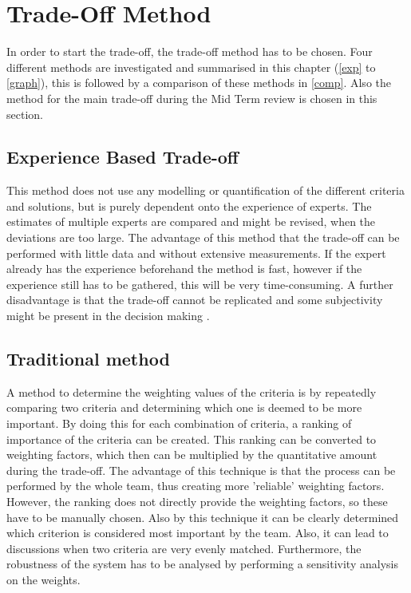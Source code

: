 \newpage
\chapter{Trade-Off Method}
\label{ch4-method}


In order to start the trade-off, the trade-off method has to be chosen. Four different methods are investigated and summarised in this chapter (\autoref{exp} to \autoref{graph}), this is followed by a comparison of these methods in \autoref{comp}. Also the method for the main trade-off during the Mid Term review is chosen in this section.

\section{Experience Based Trade-off}
\label{exp}
This method does not use any modelling or quantification of the different criteria and solutions, but is purely dependent onto the experience of experts. The estimates of multiple experts are compared and might be revised, when the deviations are too large. The advantage of this method that the trade-off can be performed with little data and without extensive measurements. If the expert already has the experience beforehand the method is fast, however if the experience still has to be gathered, this will be very time-consuming. A further disadvantage is that the trade-off cannot be replicated and some subjectivity might be present in the decision making \cite{tradeoff}.

\section{Traditional method}
A method to determine the weighting values of the criteria is by repeatedly comparing two criteria and determining which one is deemed to be more important. By doing this for each combination of criteria, a ranking of importance of the criteria can be created. This ranking can be converted to weighting factors, which then can be multiplied by the quantitative amount during the trade-off. The advantage of this technique is that the process can be performed by the whole team, thus creating more 'reliable' weighting factors. However, the ranking does not directly provide the weighting factors, so these have to be manually chosen. Also by this technique it can be clearly determined which criterion is considered most important by the team. Also, it can lead to discussions when two criteria are very evenly matched. Furthermore, the robustness of the system has to be analysed by performing a sensitivity analysis on the weights. 


